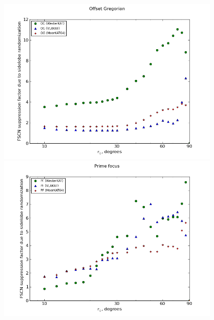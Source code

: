 \documentclass{aa}
\begin{document}
\begin{figure}
\end{figure}


\begin{figure}
  \includegraphics[width=\columnwidth]{rr-suppression-og}
  \includegraphics[width=\columnwidth]{rr-suppression-pf}

\end{figure}
\end{document}
